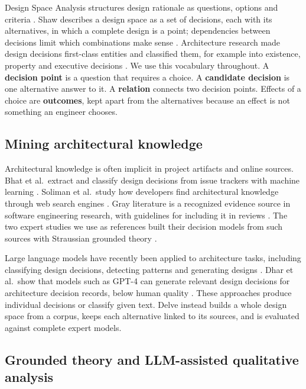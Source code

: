 \documentclass[conference]{IEEEtran}
\begin{document}
Design Space Analysis structures design rationale as questions, options and criteria \cite{qoc}. Shaw describes a design space as a set of decisions, each with its alternatives, in which a complete design is a point; dependencies between decisions limit which combinations make sense \cite{shaw}. Architecture research made design decisions first-class entities \cite{jansenbosch} and classified them, for example into existence, property and executive decisions \cite{kruchten}. We use this vocabulary throughout. A \textbf{decision point} is a question that requires a choice. A \textbf{candidate decision} is one alternative answer to it. A \textbf{relation} connects two decision points. Effects of a choice are \textbf{outcomes}, kept apart from the alternatives because an effect is not something an engineer chooses.

\subsection{Mining architectural knowledge}

Architectural knowledge is often implicit in project artifacts and online sources. Bhat et al.~extract and classify design decisions from issue trackers with machine learning \cite{bhat}. Soliman et al.~study how developers find architectural knowledge through web search engines \cite{soliman}. Gray literature is a recognized evidence source in software engineering research, with guidelines for including it in reviews \cite{garousi}. The two expert studies we use as references built their decision models from such sources with Straussian grounded theory \cite{warnett,fang}.

Large language models have recently been applied to architecture tasks, including classifying design decisions, detecting patterns and generating designs \cite{saslr}. Dhar et al.~show that models such as GPT-4 can generate relevant design decisions for architecture decision records, below human quality \cite{dhar}. These approaches produce individual decisions or classify given text. Delve instead builds a whole design space from a corpus, keeps each alternative linked to its sources, and is evaluated against complete expert models.

\subsection{Grounded theory and LLM-assisted qualitative analysis}
\end{document}
